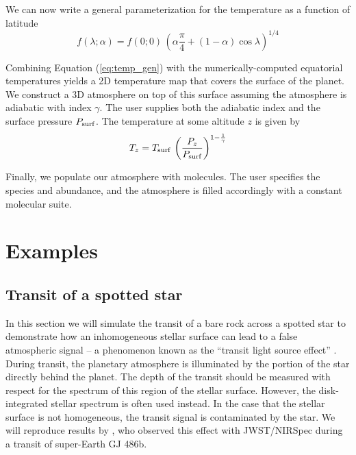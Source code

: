\documentclass[twocolumn,linenumbers]{aastex631}
\begin{document}
We can now write a general parameterization for the temperature as a function of latitude
\begin{equation}
    \label{eq:temp_gen}
    f(\lambda;\alpha) = f(0;0)\,\left(\alpha \frac{\pi}{4} + (1-\alpha) \cos{\lambda}\right)^{1/4}
\end{equation}

Combining Equation (\ref{eq:temp_gen}) with the numerically-computed equatorial temperatures yields a 2D temperature map that covers the surface of the planet. We construct a 3D atmosphere on top of this surface assuming the atmosphere is adiabatic with index $\gamma$. The user supplies both the adiabatic index and the surface pressure $P_{\rm surf}$. The temperature at some altitude $z$ is given by
\begin{equation}
    T_z = T_{\rm surf}\,\left( \frac{P_z}{P_{\rm surf}} \right)^{1-\frac{1}{\gamma}}
\end{equation}

Finally, we populate our atmosphere with molecules. The user specifies the species and abundance, and the atmosphere is filled accordingly with a constant molecular suite.

\section{Examples \label{sec:examples}}

\subsection{Transit of a spotted star}

In this section we will simulate the transit of a bare rock across a spotted star to demonstrate how an inhomogeneous
stellar surface can lead to a false atmospheric signal -- a phenomenon known as the ``transit light source effect'' \citep{rackham2018}.
During transit, the planetary atmosphere is illuminated by the portion of the star directly behind the planet. The depth of the transit
should be measured with respect for the spectrum of this region of the stellar surface. However, the disk-integrated stellar spectrum is often used instead.
In the case that the stellar surface is not homogeneous, the transit signal is contaminated by the star.
We will reproduce results by \citet{moran2023}, who observed this effect with JWST/NIRSpec during a transit of super-Earth GJ 486b.
\end{document}
